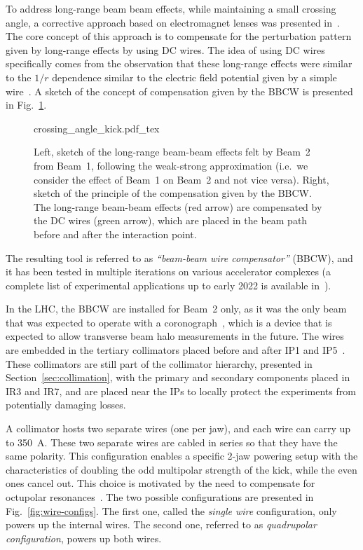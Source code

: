 To address long-range beam beam effects, while maintaining a small crossing angle, a corrective approach based on electromagnet lenses was presented in~\cite{Koutchouk:692058}. The core concept of this approach is to compensate for the perturbation pattern given by long-range effects by using DC wires. The idea of using DC wires specifically comes from the observation that these long-range effects were similar to the $1/r$ dependence similar to the electric field potential given by a simple wire~\cite{PhysRevSTAB.5.074001}. A sketch of the concept of compensation given by the BBCW is presented in Fig.~\ref{fig:wire-baseline}.

\begin{figure}[hpt]
    \centering
    \def\svgwidth{1.0\textwidth}
    {crossing_angle_kick.pdf_tex}
    \caption{Left, sketch of the long-range beam-beam effects felt by Beam~2 from Beam~1, following the weak-strong approximation (i.e.\ we consider the effect of Beam~1 on Beam~2 and not vice versa). Right, sketch of the principle of the compensation given by the BBCW. The long-range beam-beam effects (red arrow) are compensated by the DC wires (green arrow), which are placed in the beam path before and after the interaction point.}
    \label{fig:wire-baseline}
\end{figure}

The resulting tool is referred to as \textit{``beam-beam wire compensator''} (BBCW), and it has been tested in multiple iterations on various accelerator complexes (a complete list of experimental applications up to early 2022 is available in~\cite{axel.wires}).

In the LHC, the BBCW are installed for Beam~2 only, as it was the only beam that was expected to operate with a coronograph~\cite{Goldblatt:2313940}, which is a device that is expected to allow transverse beam halo measurements in the future. The wires are embedded in the tertiary collimators placed before and after IP1 and IP5~\cite{Rossi:2696270}. These collimators are still part of the collimator hierarchy, presented in Section~\ref{sec:collimation}, with the primary and secondary components placed in IR3 and IR7, and are placed near the IPs to locally protect the experiments from potentially damaging losses.

A collimator hosts two separate wires (one per jaw), and each wire can carry up to \SI{350}{\ampere}. These two separate wires are cabled in series so that they have the same polarity. This configuration enables a specific 2-jaw powering setup with the characteristics of doubling the odd multipolar strength of the kick, while the even ones cancel out. This choice is motivated by the need to compensate for octupolar resonances~\cite{Poyet:2703503}. The two possible configurations are presented in Fig.~\ref{fig:wire-configs}. The first one, called the \textit{single wire} configuration, only powers up the internal wires. The second one, referred to as \textit{quadrupolar configuration}, powers up both wires.

